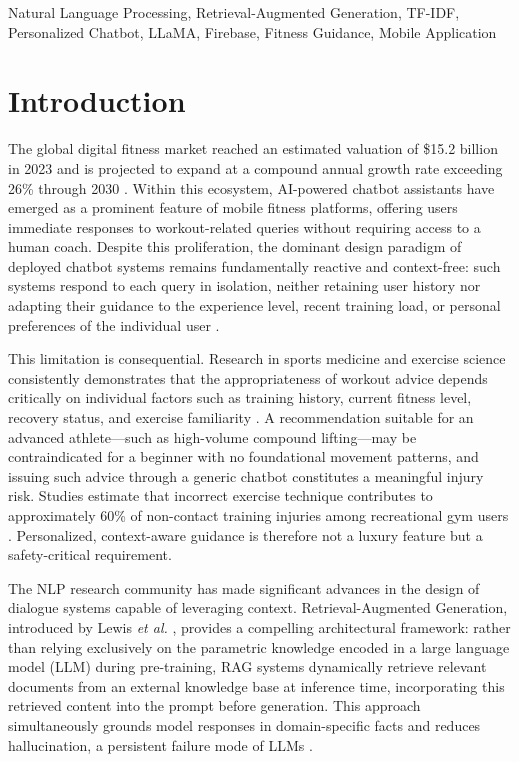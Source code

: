 \documentclass[conference]{IEEEtran}
\begin{document}
\begin{IEEEkeywords}
Natural Language Processing, Retrieval-Augmented Generation, TF-IDF, Personalized Chatbot, LLaMA, Firebase, Fitness Guidance, Mobile Application
\end{IEEEkeywords}

\section{Introduction}

The global digital fitness market reached an estimated valuation of \$15.2 billion in 2023 and is projected to expand at a compound annual growth rate exceeding 26\% through 2030 \cite{grandview2023}. Within this ecosystem, AI-powered chatbot assistants have emerged as a prominent feature of mobile fitness platforms, offering users immediate responses to workout-related queries without requiring access to a human coach. Despite this proliferation, the dominant design paradigm of deployed chatbot systems remains fundamentally reactive and context-free: such systems respond to each query in isolation, neither retaining user history nor adapting their guidance to the experience level, recent training load, or personal preferences of the individual user \cite{laranjo2018conversational}.

This limitation is consequential. Research in sports medicine and exercise science consistently demonstrates that the appropriateness of workout advice depends critically on individual factors such as training history, current fitness level, recovery status, and exercise familiarity \cite{acsm2021}. A recommendation suitable for an advanced athlete—such as high-volume compound lifting—may be contraindicated for a beginner with no foundational movement patterns, and issuing such advice through a generic chatbot constitutes a meaningful injury risk. Studies estimate that incorrect exercise technique contributes to approximately 60\% of non-contact training injuries among recreational gym users \cite{winwood2014}. Personalized, context-aware guidance is therefore not a luxury feature but a safety-critical requirement.

The NLP research community has made significant advances in the design of dialogue systems capable of leveraging context. Retrieval-Augmented Generation, introduced by Lewis \textit{et al.} \cite{lewis2020rag}, provides a compelling architectural framework: rather than relying exclusively on the parametric knowledge encoded in a large language model (LLM) during pre-training, RAG systems dynamically retrieve relevant documents from an external knowledge base at inference time, incorporating this retrieved content into the prompt before generation. This approach simultaneously grounds model responses in domain-specific facts and reduces hallucination, a persistent failure mode of LLMs \cite{ji2023hallucination}.
\end{document}
